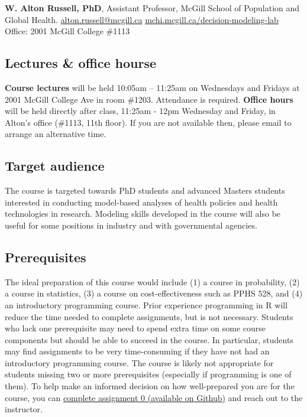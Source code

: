 \documentclass[
  letterpaper,
  DIV=11,
  numbers=noendperiod]{scrartcl}
\begin{document}
\textbf{W. Alton Russell, PhD}, Assistant Professor, McGill School of
Population and Global Health. \url{alton.russell@mcgill.ca} \textbar{}
\url{mchi.mcgill.ca/decision-modeling-lab} \textbar{} Office: 2001
McGill College \#1113

\hypertarget{lectures-office-hourse}{%
\subsection{Lectures \& office hourse}\label{lectures-office-hourse}}

\textbf{Course lectures} will be held 10:05am -- 11:25am on Wednesdays
and Fridays at 2001 McGill College Ave in room \#1203. Attendance is
required. \textbf{Office hours} will be held directly after class,
11:25am - 12pm Wednesday and Friday, in Alton's office (\#1113, 11th
floor). If you are not available then, please email to arrange an
alternative time.

\hypertarget{target-audience}{%
\subsection{Target audience}\label{target-audience}}

The course is targeted towards PhD students and advanced Masters
students interested in conducting model-based analyses of health
policies and health technologies in research. Modeling skills developed
in the course will also be useful for some positions in industry and
with governmental agencies.

\hypertarget{prerequisites}{%
\subsection{Prerequisites}\label{prerequisites}}

The ideal preparation of this course would include (1) a course in
probability, (2) a course in statistics, (3) a course on
cost-effectiveness such as PPHS 528, and (4) an introductory programming
course. Prior experience programming in R will reduce the time needed to
complete assignments, but is not necessary. Students who lack one
prerequisite may need to spend extra time on some course components but
should be able to succeed in the course. In particular, students may
find assignments to be very time-consuming if they have not had an
introductory programming course. The course is likely not appropriate
for students missing two or more prerequisites (especially if
programming is one of them). To help make an informed decision on how
well-prepared you are for the course, you can
\href{https://github.com/altonrus/epib-676/tree/main/assignments}{complete
assignment 0 (available on Github)} and reach out to the instructor.
\end{document}
